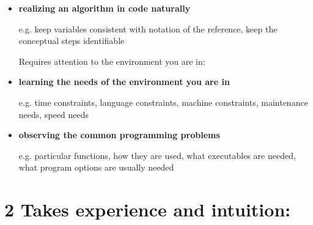\begin{itemize}
\item {\bf realizing an algorithm in code naturally}

		e.g. keep variables consistent with notation of the reference, keep the
			conceptual steps identifiable

	Requires attention to the environment you are in:

\item {\bf learning the needs of the environment you are in}

		e.g. time constraints, language constraints, machine constraints, 
			maintenance needs, speed needs

\item {\bf observing the common programming problems}

		e.g. particular functions, how they are used, what executables are 
			needed, what program options are usually needed
\end{itemize}

\pagebreak
\section*{2  Takes experience and intuition:}

